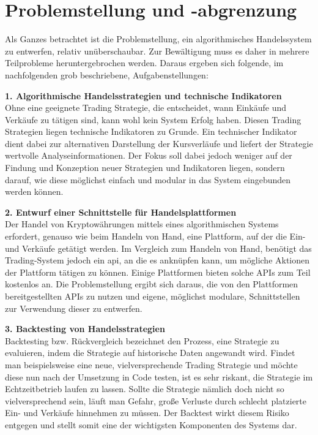 \documentclass[oneside]{ausarbeitung}
\begin{document}
\section{Problemstellung und -abgrenzung}
\label{sec:problemstellung}

Als Ganzes betrachtet ist die Problemstellung, ein algorithmisches
Handelssystem zu entwerfen, relativ unüberschaubar. Zur Bewältigung
muss es daher in mehrere Teilprobleme heruntergebrochen werden. Daraus
ergeben sich folgende, im nachfolgenden grob beschriebene,
Aufgabenstellungen:

\textbf{1. Algorithmische Handelsstrategien und technische Indikatoren} \\
Ohne eine geeignete Trading Strategie, die entscheidet, wann Einkäufe
und Verkäufe zu tätigen sind, kann wohl kein System Erfolg haben.
Diesen Trading Strategien liegen technische Indikatoren zu Grunde. Ein
technischer Indikator dient dabei zur alternativen Darstellung der
Kursverläufe und liefert der Strategie wertvolle Analyseinformationen.
Der Fokus soll dabei jedoch weniger auf der Findung und Konzeption
neuer Strategien und Indikatoren liegen, sondern darauf, wie diese
möglichst einfach und modular in das System eingebunden werden
können.

\textbf{2. Entwurf einer Schnittstelle für Handelsplattformen} \\
Der Handel von Kryptowährungen mittels eines algorithmischen Systems
erfordert, genauso wie beim Handeln von Hand, eine Plattform, auf der
die Ein- und Verkäufe getätigt werden. Im Vergleich zum Handeln von
Hand, benötigt das Trading-System jedoch ein \ac{api}, an die es
anknüpfen kann, um mögliche Aktionen der Plattform tätigen zu
können. Einige Plattformen bieten solche APIs zum Teil kostenlos an.
Die Problemstellung ergibt sich daraus, die von den Plattformen
bereitgestellten APIs zu nutzen und eigene, möglichst modulare,
Schnittstellen zur Verwendung dieser zu entwerfen.

\textbf{3. Backtesting von Handelsstrategien} \\
Backtesting bzw. Rückvergleich bezeichnet den Prozess, eine Strategie
zu evaluieren, indem die Strategie auf historische Daten angewandt
wird\cite{backtesting_definition}. Findet man beispielsweise eine neue,
vielversprechende Trading
Strategie und möchte diese nun nach der Umsetzung in Code testen, ist
es sehr riskant, die Strategie im Echtzeitbetrieb laufen zu lassen.
Sollte die Strategie nämlich doch nicht so vielversprechend sein,
läuft man Gefahr, große Verluste durch schlecht platzierte Ein- und
Verkäufe hinnehmen zu müssen. Der Backtest wirkt diesem Risiko
entgegen und stellt somit eine der wichtigsten Komponenten des Systems
dar.
\end{document}
